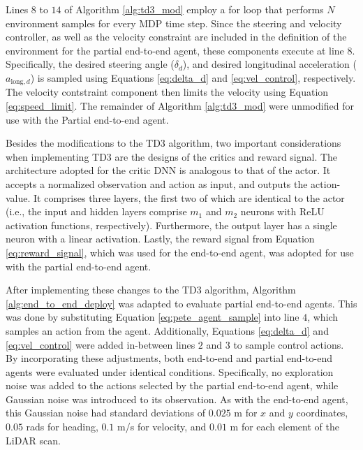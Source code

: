 Lines $8$ to $14$ of Algorithm \ref{alg:td3_mod} employ a for loop that performs $N$ environment samples for every MDP time step.
Since the steering and velocity controller, as well as the velocity constraint are included in the definition of the environment for the partial end-to-end agent, 
these components execute at line $8$.
Specifically, the desired steering angle ($\delta_d$), and desired longitudinal acceleration ($a_{\text{long},d}$) is sampled using Equations \ref{eq:delta_d} and \ref{eq:vel_control}, respectively.
The velocity contstraint component then limits the velocity using Equation \ref{eq:speed_limit}.
The remainder of Algorithm \ref{alg:td3_mod} were unmodified for use with the Partial end-to-end agent.

Besides the modifications to the TD3 algorithm, two important considerations when implementing TD3 are the designs of the critics and reward signal.
The architecture adopted for the critic DNN is analogous to that of the actor.
It accepts a normalized observation and action as input, and outputs the action-value.
It comprises three layers, the first two of which are identical to the actor (i.e., the input and hidden layers comprise $m_1$ and $m_2$ neurons with ReLU activation functions, respectively).
Furthermore, the output layer has a single neuron with a linear activation.
Lastly, the reward signal from Equation \ref{eq:reward_signal}, which was used for the end-to-end agent, was adopted for use with the partial end-to-end agent. 



After implementing these changes to the TD3 algorithm, Algorithm \ref{alg:end_to_end_deploy} was adapted to evaluate partial end-to-end agents.
This was done by substituting Equation \ref{eq:pete_agent_sample} into line $4$, which samples an action from the agent. 
Additionally, Equations \ref{eq:delta_d} and \ref{eq:vel_control} were added in-between lines $2$ and $3$ to sample control actions.
By incorporating these adjustments, both end-to-end and partial end-to-end agents were evaluated under identical conditions. 
Specifically, no exploration noise was added to the actions selected by the partial end-to-end agent, while Gaussian noise was introduced to its observation.
As with the end-to-end agent, this Gaussian noise had standard deviations of $0.025$ m for $x$ and $y$ coordinates, $0.05$ rads for heading, $0.1$ m/s for velocity, and $0.01$ m for each element of the LiDAR scan. 











